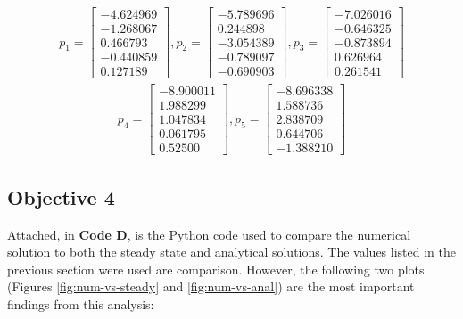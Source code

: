 \documentclass[a4paper, 12pt]{article}
\begin{document}
\begin{align*}
	p_1 = 
	\begin{bmatrix}
		-4.624969\\ -1.268067\\ 0.466793\\ -0.440859\\ 0.127189
	\end{bmatrix},
	p_2=
	\begin{bmatrix}
		-5.789696\\ 0.244898\\-3.054389\\ -0.789097\\ -0.690903
	\end{bmatrix},
	p_3 = 
	\begin{bmatrix}
		-7.026016\\ -0.646325\\ -0.873894\\ 0.626964\\ 0.261541
	\end{bmatrix}
\end{align*}
\begin{align*}
	p_4=
	\begin{bmatrix}
		-8.900011\\ 1.988299\\ 1.047834\\ 0.061795\\ 0.52500
	\end{bmatrix},
	p_5=
	\begin{bmatrix}
		-8.696338\\ 1.588736\\ 2.838709\\ 0.644706\\ -1.388210
	\end{bmatrix}
\end{align*}

\subsection{Objective 4}
Attached, in \textbf{Code D}, is the Python code used to compare the numerical solution to both the steady state and analytical solutions. The values listed in the previous section were used are comparison. However, the following two plots (Figures \ref{fig:num-vs-steady} and \ref{fig:num-vs-anal}) are the most important findings from this analysis:
\end{document}
